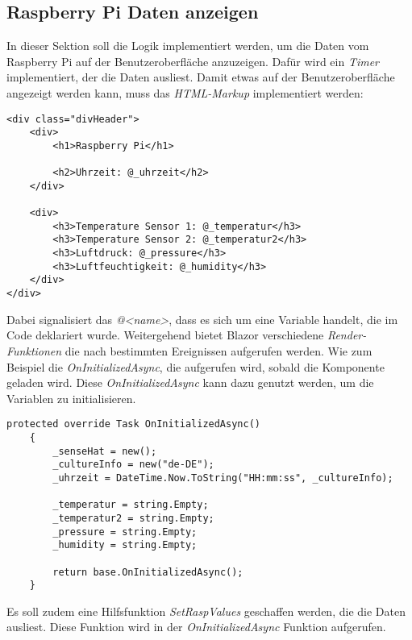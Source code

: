 \subsection{Raspberry Pi Daten anzeigen}
\label{subsec:DatenAnzeigen}
In dieser Sektion soll die Logik implementiert werden, um die Daten vom Raspberry Pi auf der
Benutzeroberfläche anzuzeigen. Dafür wird ein
\emph{Timer} implementiert, der die Daten ausliest.
\newline
\newline
Damit etwas auf der Benutzeroberfläche angezeigt werden kann, muss das \emph{HTML-Markup}
implementiert werden:

\begin{lstlisting}[language={[Sharp]C}, caption=HTML-Markup,
    label=lst:HtmlMarkup]
<div class="divHeader">
    <div>
        <h1>Raspberry Pi</h1>

        <h2>Uhrzeit: @_uhrzeit</h2>
    </div>

    <div>
        <h3>Temperature Sensor 1: @_temperatur</h3>
        <h3>Temperature Sensor 2: @_temperatur2</h3>
        <h3>Luftdruck: @_pressure</h3>
        <h3>Luftfeuchtigkeit: @_humidity</h3>
    </div>
</div>
\end{lstlisting}

Dabei signalisiert das \emph{@<name>}, dass es sich um eine Variable handelt, die im Code
deklariert wurde.
\newline
\newline
Weitergehend bietet Blazor verschiedene \emph{Render-Funktionen} die nach bestimmten Ereignissen
aufgerufen werden. Wie zum Beispiel die \emph{OnInitializedAsync}, die aufgerufen wird, sobald die
Komponente geladen wird. Diese \emph{OnInitializedAsync} kann dazu genutzt werden, um die
Variablen zu initialisieren.

\begin{lstlisting}[language={[Sharp]C}, caption=Render-Funktion: OnInitializedAsync,
    label=lst:OnInitializedAsync]
    protected override Task OnInitializedAsync()
    {
        _senseHat = new();
        _cultureInfo = new("de-DE");
        _uhrzeit = DateTime.Now.ToString("HH:mm:ss", _cultureInfo);

        _temperatur = string.Empty;
        _temperatur2 = string.Empty;
        _pressure = string.Empty;
        _humidity = string.Empty;

        return base.OnInitializedAsync();
    }
\end{lstlisting}

Es soll zudem eine Hilfsfunktion \emph{SetRaspValues} geschaffen werden, die die Daten
ausliest. Diese Funktion wird in der \emph{OnInitializedAsync} Funktion aufgerufen.

